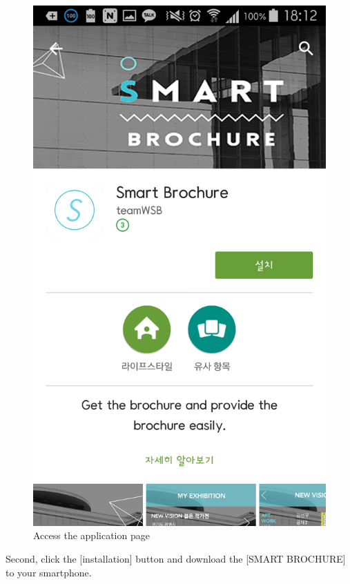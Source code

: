 \documentclass[conference]{IEEEtran}
\begin{document}
\begin{figure}[htbp]
\begin{center}
    \includegraphics[scale=0.18]{img_install02}
    \caption{Access the application page} 
\end{center}
\end{figure}

Second, click the [installation] button and download the [SMART BROCHURE] to your smartphone.\\
\end{document}
